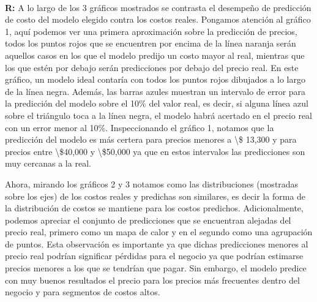 \documentclass[11pt]{article}
\begin{document}
    \begin{center}
    \end{center}
    { \hspace*{\fill} \\}
    
    \textbf{R:} A lo largo de los 3 gráficos mostrados se contrasta el
desempeño de predicción de costo del modelo elegido contra los costos
reales. Pongamos atención al gráfico 1, aquí podemos ver una primera
aproximación sobre la predicción de precios, todos los puntos rojos que
se encuentren por encima de la línea naranja serán aquellos casos en los
que el modelo predijo un costo mayor al real, mientras que los que estén
por debajo serán predicciones por debajo del precio real. En este
gráfico, un modelo ideal contaría con todos los puntos rojos dibujados a
lo largo de la línea negra. Además, las barras azules muestran un
intervalo de error para la predicción del modelo sobre el 10\% del valor
real, es decir, si alguna línea azul sobre el triángulo toca a la línea
negra, el modelo habrá acertado en el precio real con un error menor al
10\%. Inspeccionando el gráfico 1, notamos que la predicción del modelo
es más certera para precios menores a \textbackslash\$ 13,300 y para
precios entre \textbackslash\$40,000 y \textbackslash\$50,000 ya que en
estos intervalos las predicciones son muy cercanas a la real.

Ahora, mirando los gráficos 2 y 3 notamos como las distribuciones
(mostradas sobre los ejes) de los costos reales y predichas son
similares, es decir la forma de la distribución de costos se mantiene
para los costos predichos. Adicionalmente, podemos apreciar el conjunto
de predicciones que se encuentran alejadas del precio real, primero como
un mapa de calor y en el segundo como una agrupación de puntos. Esta
observación es importante ya que dichas predicciones menores al precio
real podrían significar pérdidas para el negocio ya que podrían
estimarse precios menores a los que se tendrían que pagar. Sin embargo,
el modelo predice con muy buenos resultados el precio para los precios
más frecuentes dentro del negocio y para segmentos de costos altos.


    
    
    
\end{document}
